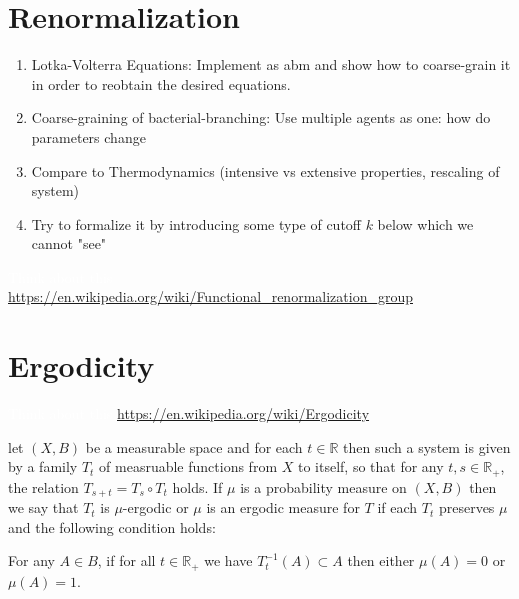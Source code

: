 \documentclass{article}
\newcommand{\todo}[1]{\colorbox{WildStrawberry}{\textcolor{white}{#1}}}
\newcommand{\R}{\mathbb{R}}
\begin{document}
\section{Renormalization}
\label{section:renormalization}

\begin{enumerate}
    \item Lotka-Volterra Equations: Implement as \ac{abm} and show how to coarse-grain it in order
        to reobtain the desired equations.
    \item Coarse-graining of bacterial-branching: Use multiple agents as one: how do parameters
        change
    \item Compare to Thermodynamics (intensive vs extensive properties, rescaling of system)
    \item Try to formalize it by introducing some type of cutoff $k$ below which we cannot "see"
\end{enumerate}

\todo{Think about this}
\url{https://en.wikipedia.org/wiki/Functional_renormalization_group}

\section{Ergodicity}
\label{section:ergodicity}

\todo{Think about this}
\url{https://en.wikipedia.org/wiki/Ergodicity}

let $(X, B)$ be a measurable space and for each $t\in\R$ then such a system is given by a family
$T_t$ of measruable functions from $X$ to itself, so that for any $t,s\in\R_+$, the relation
$T_{s+t}=T_s\circ T_t$ holds.
If $\mu$ is a probability measure on $(X, B)$ then we say that $T_t$ is $\mu$-ergodic or $\mu$ is an
ergodic measure for $T$ if each $T_t$ preserves $\mu$ and the following condition holds:

For any $A\in B$, if for all $t\in\R_+$ we have $T_t^{-1}(A)\subset A$ then either $\mu(A)=0$ or
$\mu(A)=1$.
\end{document}
